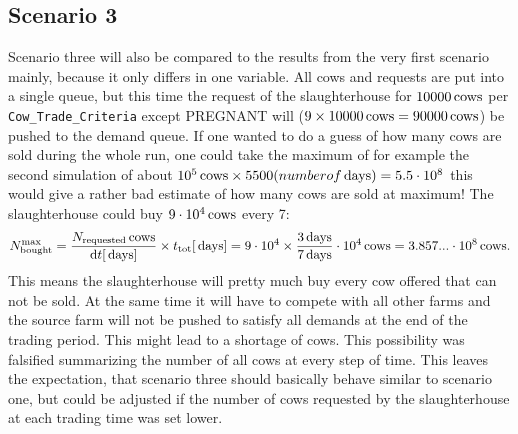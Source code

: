 \subsection{Scenario 3}
Scenario three will also be compared to the results from the very first scenario mainly, because it only differs in one variable. All cows and requests are put into a single queue, but this time the request of the slaughterhouse for $10000\,\text{cows}$ per {\tt Cow\_Trade\_Criteria} except PREGNANT will ($9\times 10000\,\text{cows} = 90000\,\text{cows}$) be pushed to the demand queue. If one wanted to do a guess of how many cows are sold during the whole run, one could take the maximum of for example the second simulation of about $10^5\,\text{cows} \times 5500(number of \,\text{days}) = 5.5\cdot 10^8$ this would give a rather bad estimate of how many cows are sold at maximum! The slaughterhouse could buy $9\cdot 10^4\,\text{cows}$ every 7\days: 
\begin{equation}
N_\text{bought}^\text{max} = \frac{N_\text{requested}\,\text{cows}}{\text{d}t[\,\text{days}]}\times t_\text{tot}[\,\text{days}] = 9\cdot 10^4 \times \frac{3\,\text{days}}{7\,\text{days}}\cdot 10^4 \,\text{cows}= 3.857...\cdot 10^8\,\text{cows}.
\end{equation}
This means the slaughterhouse will pretty much buy every cow offered that can not be sold. At the same time it will have to compete with all other farms and the source farm will not be pushed to satisfy all demands at the end of the trading period. This might lead to a shortage of cows. This possibility was falsified summarizing the number of all cows at every step of time. This leaves the expectation, that scenario three should basically behave similar to scenario one, but could be adjusted if the number of cows requested by the slaughterhouse at each trading time was set lower.
